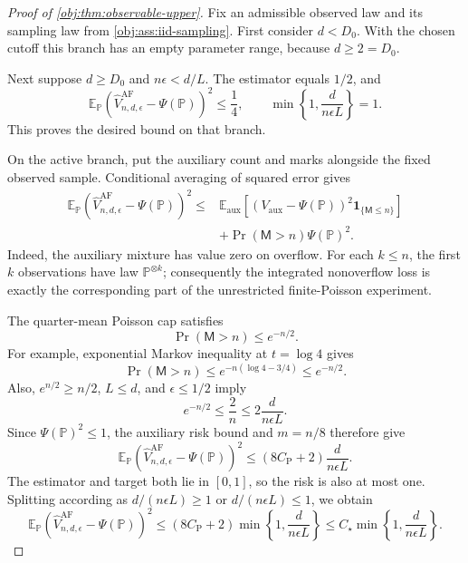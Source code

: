 \documentclass[11pt]{article}
\begin{document}
\begin{proof}[Proof of \cref{obj:thm:observable-upper}]
Fix an admissible observed law and its sampling law from \cref{obj:ass:iid-sampling}. First consider \(d<D_0\). With the chosen cutoff this branch has an empty parameter range, because \(d\ge2=D_0\).

Next suppose \(d\ge D_0\) and \(n\epsilon<d/L\). The estimator equals \(1/2\), and
\[
\mathbb E_{\mathbb P}
\left(\widehat V_{n,d,\epsilon}^{\mathrm{AF}}-\Psi(\mathbb P)\right)^2
\le\frac14,
\qquad
\min\left\{1,\frac{d}{n\epsilon L}\right\}=1.
\]
This proves the desired bound on that branch.

On the active branch, put the auxiliary count and marks alongside the fixed observed sample. Conditional averaging of squared error gives
\[
\begin{aligned}
\mathbb E_{\mathbb P}
\left(\widehat V_{n,d,\epsilon}^{\mathrm{AF}}-\Psi(\mathbb P)\right)^2
\le{}&
\mathbb E_{\mathrm{aux}}
\left[
(V_{\mathrm{aux}}-\Psi(\mathbb P))^2
\mathbf1_{\{\mathsf M\le n\}}
\right]\\
&+\Pr(\mathsf M>n)\Psi(\mathbb P)^2.
\end{aligned}
\]
Indeed, the auxiliary mixture has value zero on overflow. For each \(k\le n\), the first \(k\) observations have law \(\mathbb P^{\otimes k}\); consequently the integrated nonoverflow loss is exactly the corresponding part of the unrestricted finite-Poisson experiment.

The quarter-mean Poisson cap satisfies
\[
\Pr(\mathsf M>n)\le e^{-n/2}.
\]
For example, exponential Markov inequality at \(t=\log4\) gives
\[
\Pr(\mathsf M>n)
\le e^{-n(\log4-3/4)}
\le e^{-n/2}.
\]
Also, \(e^{n/2}\ge n/2\), \(L\le d\), and \(\epsilon\le1/2\) imply
\[
e^{-n/2}\le\frac2n
\le2\frac{d}{n\epsilon L}.
\]
Since \(\Psi(\mathbb P)^2\le1\), the auxiliary risk bound and \(m=n/8\) therefore give
\[
\mathbb E_{\mathbb P}
\left(\widehat V_{n,d,\epsilon}^{\mathrm{AF}}-\Psi(\mathbb P)\right)^2
\le
(8C_{\mathrm P}+2)\frac{d}{n\epsilon L}.
\]
The estimator and target both lie in \([0,1]\), so the risk is also at most one. Splitting according as \(d/(n\epsilon L)\ge1\) or \(d/(n\epsilon L)\le1\), we obtain
\[
\mathbb E_{\mathbb P}
\left(\widehat V_{n,d,\epsilon}^{\mathrm{AF}}-\Psi(\mathbb P)\right)^2
\le
(8C_{\mathrm P}+2)
\min\left\{1,\frac{d}{n\epsilon L}\right\}
\le
C_\star\min\left\{1,\frac{d}{n\epsilon L}\right\}.
\]


\end{proof}
\end{document}
